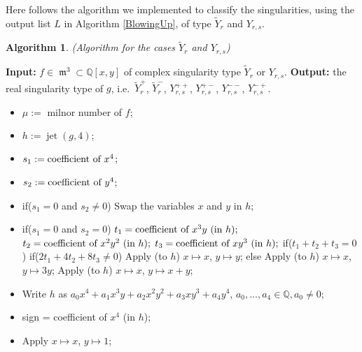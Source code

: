 \documentclass{amsproc}
\DeclareMathOperator{\m}{\mathfrak{m}}
\DeclareMathOperator{\jt}{jet}
\begin{document}
Here follows the algorithm we implemented to classify the singularities, using the output list $L$ in Algorithm \ref{BlowingUp}, of type $\widetilde Y_r$ and $Y_{r,s}$.

\newtheorem{Y[1}[kjet]{Algorithm}
\begin{Y[1}(Algorithm for the cases $\widetilde Y_r$ and $Y_{r,s}$)\label{Y[r,s]}
\end{Y[1}
\noindent\textnormal{\bf Input:} $f\in \m^3\subset\mathbb Q[x,y]$ of complex singularity type $\widetilde Y_r$ or $Y_{r,s}$.\newline
\textnormal{\bf Output:} the real singularity type of $g$, i.e.~$\widetilde Y_r^+$, $\widetilde Y_r^-$, $Y_{r,s}^{++}$, $Y_{r,s}^{+-}$, $Y_{r,s}^{--}$, $Y_{r,s}^{-+}$.
\begin{itemize}
\item $\mu :=$ milnor number of $f$; 
\item $h :=  \jt(g,4);$
\item $s_1 := \textnormal{coefficient of }x^4$;
\item $s_2 := \textnormal{coefficient of }y^4$;
\item if($s_1=0$ and $s_2\neq 0$)\newline
\phantom{}\quad Swap the variables $x$ and $y$ in $h$;
\item if($s_1=0$ and $s_2=0$)\newline
\phantom{}\quad $t_1=\textnormal{coefficient of }x^3y\ (\textnormal{in } h);$\newline
\phantom{}\quad $t_2=\textnormal{coefficient of }x^2y^2\ (\textnormal{in } h);$\newline
\phantom{}\quad $t_3=\textnormal{coefficient of }xy^3\ (\textnormal{in } h);$\newline
\phantom{}\quad if($t_1+t_2+t_3=0$)\newline
\phantom{}\quad\quad if($2t_1+4t_2+8t_3\neq 0$)\newline
\phantom{}\quad\quad\quad Apply (to $h$) $x\mapsto x$, $y\mapsto y$;\newline
\phantom{}\quad\quad else\newline
\phantom{}\quad\quad\quad Apply (to $h$) $x\mapsto x$, $y\mapsto 3y$;\newline
\phantom{}\quad\quad Apply (to $h$) $x\mapsto x$, $y\mapsto x+y$;
\item Write $h$ as $a_0x^4+a_1x^3y+a_2x^2y^2+a_3xy^3+a_4y^4$, $a_0,\ldots,a_4\in\mathbb Q, a_0\neq 0$;
\item sign = coefficient of $x^4$ (in $h$);
\item Apply $x\mapsto x$, $y\mapsto 1$;

\end{itemize}
\end{document}

